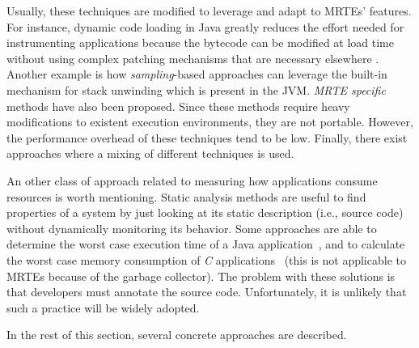 Usually, these techniques are modified to leverage and adapt to MRTEs' features.
For instance, dynamic code loading in Java greatly reduces the effort needed for instrumenting applications because the bytecode can be modified at load time without using complex patching mechanisms that are necessary elsewhere \cite{Gregg:2011:DDT:1971960}.
Another example is how \textit{sampling}-based approaches can leverage the built-in mechanism for stack unwinding which is present in the JVM.
\textit{MRTE specific} methods have also been proposed.
Since these methods require heavy modifications to existent execution environments, they are not portable.
However, the performance overhead of these techniques tend to be low.
Finally, there exist approaches where a mixing of different techniques is used.

An other class of approach related to measuring how applications consume resources is worth mentioning.
Static analysis methods are useful to find properties of a system by just looking at its static description (i.e., source code) without dynamically monitoring its behavior.
Some approaches are able to determine the worst case execution time of a Java application~\cite{Schoeberl:2010:WET:1780354.1780356}, and to calculate the worst case memory consumption of \textit{C} applications~\cite{Puffitsch:2010:WAH:1939345.1939394} (this is not applicable to MRTEs because of the garbage collector).
The problem with these solutions is that developers must annotate the source code.
Unfortunately, it is unlikely that such a practice will be widely adopted.

In the rest of this section, several concrete approaches are described.


